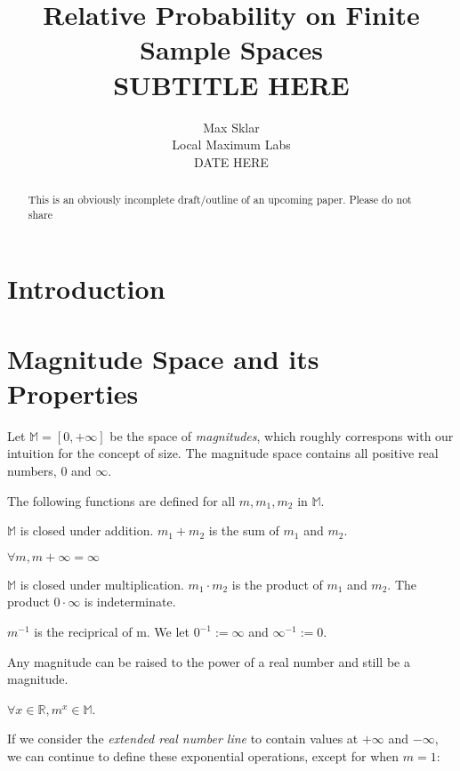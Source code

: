 \documentclass[twoside]{article}
\begin{document}
\parindent=0in
\parskip=12pt


\title{
  Relative Probability on Finite Sample Spaces \\
  \large{
    SUBTITLE HERE
  }
}

\author{Max Sklar\\ Local Maximum Labs \\ DATE HERE}
\date{}

\maketitle
\thispagestyle{empty}

\begin{abstract}
This is an obviously incomplete draft/outline of an upcoming paper. Please do not share
\end{abstract}

\section{Introduction}

\section{Magnitude Space and its Properties}

Let \(\mathbb{M} = [0, +\infty]\) be the space of \textit{magnitudes}, which roughly correspons with our intuition for the concept of size. The magnitude space contains all positive real numbers, \(0\) and \(\infty\).

The following functions are defined for all \(m, m_1, m_2\) in \(\mathbb{M}\).

\(\mathbb{M}\) is closed under addition. \(m_1 + m_2\) is the sum of \(m_1\) and \(m_2\).

\(\forall m, m + \infty = \infty\)

\(\mathbb{M}\) is closed under multiplication. \(m_1 \cdot m_2\) is the product of \(m_1\) and \(m_2\). The product \(0 \cdot \infty\) is indeterminate.

\(m^{-1}\) is the reciprical of m. We let \(0^{-1} := \infty\) and \(\infty^{-1} := 0\).

Any magnitude can be raised to the power of a real number and still be a magnitude.

\(\forall x \in \mathbb{R}, m^x \in \mathbb{M}\).

If we consider the \textit{extended real number line} to contain values at \(+\infty\) and \(-\infty\), we can continue to define these exponential operations, except for when \(m = 1\):
\end{document}

